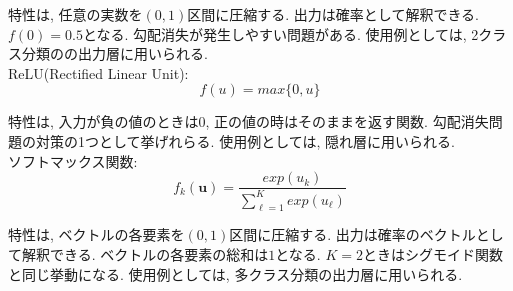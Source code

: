 \documentclass[dvipdfmx, 10pt]{jsarticle}
\begin{document}
特性は, 任意の実数を$(0,1)$区間に圧縮する. 出力は確率として解釈できる. $f(0) = 0.5$となる. 勾配消失が発生しやすい問題がある. 
使用例としては, 2クラス分類のの出力層に用いられる. \\

ReLU(Rectified Linear Unit): 
\[
f(u) = max \{0, u\}
\]

特性は, 入力が負の値のときは$0$, 正の値の時はそのままを返す関数. 勾配消失問題の対策の1つとして挙げれらる. 
使用例としては, 隠れ層に用いられる. \\

ソフトマックス関数: 
\[
f_k(\mathbf{u}) = \frac{exp(u_k)}{\sum_{\ell=1}^{K} exp(u_{\ell})}
\]

特性は, ベクトルの各要素を$(0,1)$区間に圧縮する. 出力は確率のベクトルとして解釈できる. 
ベクトルの各要素の総和は$1$となる. 
$K=2$ときはシグモイド関数と同じ挙動になる. 
使用例としては, 多クラス分類の出力層に用いられる. 
\end{document}
